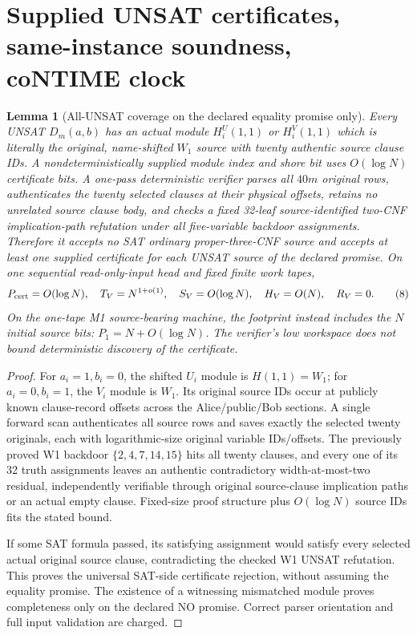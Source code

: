 \documentclass[11pt]{article}
\newtheorem{lemma}[theorem]{Lemma}
\begin{document}
\section{Supplied UNSAT certificates, same-instance soundness, coNTIME clock}
\begin{lemma}[All-UNSAT coverage on the declared equality promise only]\label{lem:cert}
Every UNSAT $D_m(a,b)$ has an actual module $H_i^U(1,1)$ or $H_i^V(1,1)$ which is literally the original, name-shifted $W_1$ source with twenty authentic source clause IDs. A nondeterministically supplied module index and shore bit uses $O(\log N)$ certificate bits. A one-pass deterministic verifier parses all $40m$ original rows, authenticates the twenty selected clauses at their physical offsets, retains no unrelated source clause body, and checks a fixed 32-leaf source-identified two-CNF implication-path refutation under all five-variable backdoor assignments. Therefore it accepts no SAT ordinary proper-three-CNF source and accepts at least one supplied certificate for each UNSAT source of the declared promise. On one sequential read-only-input head and fixed finite work tapes,
\[
P_{\rm cert}=O(\log N),\quad T_V=N^{1+o(1)},\quad S_V=O(\log N),\quad H_V=O(N),\quad R_V=0.\tag{8}
\]
On the one-tape M1 source-bearing machine, the footprint instead includes the $N$ initial source bits: $P_1=N+O(\log N)$. The verifier's low workspace does not bound deterministic \emph{discovery} of the certificate.
\end{lemma}
\begin{proof}
For $a_i=1,b_i=0$, the shifted $U_i$ module is $H(1,1)=W_1$; for $a_i=0,b_i=1$, the $V_i$ module is $W_1$. Its original source IDs occur at publicly known clause-record offsets across the Alice/public/Bob sections. A single forward scan authenticates all source rows and saves exactly the selected twenty originals, each with logarithmic-size original variable IDs/offsets. The previously proved W1 backdoor $\{2,4,7,14,15\}$ hits all twenty clauses, and every one of its 32 truth assignments leaves an authentic contradictory width-at-most-two residual, independently verifiable through original source-clause implication paths or an actual empty clause. Fixed-size proof structure plus $O(\log N)$ source IDs fits the stated bound.

If some SAT formula passed, its satisfying assignment would satisfy every selected actual original source clause, contradicting the checked W1 UNSAT refutation. This proves the universal SAT-side certificate rejection, without assuming the equality promise. The existence of a witnessing mismatched module proves completeness only on the declared NO promise. Correct parser orientation and full input validation are charged.
\end{proof}
\end{document}
